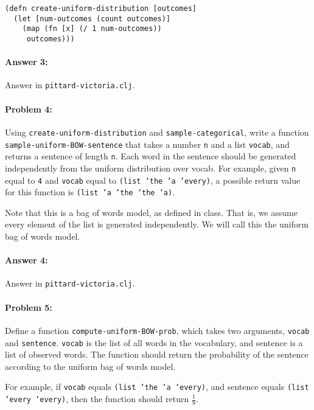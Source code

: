 \documentclass[10pt]{article}
\begin{document}
\begin{lstlisting}
(defn create-uniform-distribution [outcomes]
  (let [num-outcomes (count outcomes)]
    (map (fn [x] (/ 1 num-outcomes))
	 outcomes)))
\end{lstlisting}


\paragraph{Answer 3:} Answer in \texttt{pittard-victoria.clj}.

\hrulefill
\paragraph{Problem 4:}

Using \texttt{create-uniform-distribution} and
\texttt{sample-categorical}, write a function
\texttt{sample-uniform-BOW-sentence} that takes a number \texttt{n}
and a list \texttt{vocab}, and returns a sentence of length
\texttt{n}. Each word in the sentence should be generated
independently from the uniform distribution over vocab. For example,
given \texttt{n} equal to \texttt{4} and \texttt{vocab} equal to
\texttt{(list 'the 'a 'every)}, a possible return value for this
function is \texttt{(list 'a 'the 'the 'a)}.

Note that this is a bag of words model, as defined in class. That is,
we assume every element of the list is generated independently. We
will call this the uniform bag of words model.

\paragraph{Answer 4:} Answer in
\texttt{pittard-victoria.clj}.

\hrulefill
\paragraph{Problem 5:}

Define a function \texttt{compute-uniform-BOW-prob}, which takes two
arguments, \texttt{vocab} and \texttt{sentence}. \texttt{vocab} is the
list of all words in the vocabulary, and sentence is a list of
observed words. The function should return the probability of the
sentence according to the uniform bag of words model.

For example, if \texttt{vocab} equals \texttt{(list 'the 'a 'every)},
and sentence equals \texttt{(list 'every 'every)}, then the function
should return $\frac{1}{9}$.
\end{document}
